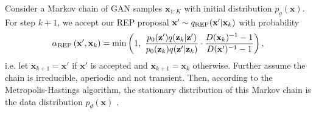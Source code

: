 \documentclass[runningheads]{llncs}
\newcommand{\bx}{\mathbf{x}}
\newcommand{\bz}{\mathbf{z}}
\newcommand{\<}{\left\langle}
\renewcommand{\>}{\right\rangle}
\begin{document}
\begin{theorem}
\label{thm:emh}
Consider a Markov chain of GAN samples $\bx_{1:K}$ with initial distribution $p_g(\bx)$. For step $k+1$, we accept our REP proposal $\bx'\sim q_{\rm REP}(\bx'|\bx_k)$ with probability
\begin{equation}
\alpha_{\rm REP}\left(\mathbf{x}^{\prime}, \mathbf{x}_{k}\right)
=\min \left(1,~\frac{p_0(\bz')q(\bz_k|\bz')}{p_0(\bz_k)q(\bz'|\bz_k)}\cdot
\frac{D(\bx_k)^{-1}-1}{D(\bx')^{-1}-1}\right),
\label{eq:cmc-mh-acceptance}
\end{equation}
i.e. let $\bx_{k+1}=\bx'$ if $\bx'$ is accepted and $\bx_{k+1}=\bx_k$ otherwise. Further assume the chain is irreducible, aperiodic and not transient. Then, according to the Metropolis-Hastings algorithm, the stationary distribution of this Markov chain is the data distribution $p_d(\bx)$ \cite{gelman2013bayesian}.
\label{thm:main}
\end{theorem}
\end{document}
